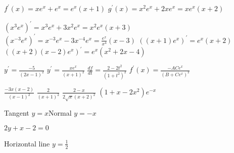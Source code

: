 \begin{Answer}[ref={exPQCRules}]
	\Question %
\begin{tasks}
	\task $f^{ \prime } \left (x\right ) =x e^{x} +e^{x} =e^{x} \left (x +1\right )$ 
	\task $g^{ \prime } \left (x\right ) =x^{2} e^{x} +2 x e^{x} =x e^{x} \left (x +2\right )$ 
\end{tasks}

\Question %
\begin{tasks}
	\task $\left (x^{3} e^{x}\right )^{ \prime } =x^{3} e^{x} +3 x^{2} e^{x} =x^{2} e^{x} \left (x +3\right )$
	\task $\left (x^{ -3} e^{x}\right )^{ \prime } =x^{ -3} e^{x} -3 x^{ -4} e^{x} =\frac{e^{x}}{x^{4}} \left (x -3\right )$ 
	\task $\left (\left (x +1\right ) e^{x}\right )^{ \prime } =e^{x} \left (x +2\right )$
	\task $\left (\left (x +2\right ) \left (x -2\right ) e^{x}\right )^{ \prime } =e^{x} \left (x^{2} +2 x -4\right )$
\end{tasks}

\Question %
\begin{tasks}
	\task $y^{ \prime } =\frac{ -5}{\left (2 x -1\right )^{2}}$ 
	\task $y^{ \prime } =\frac{x e^{x}}{\left (x +1\right )^{2}}$ 
	\task $\frac{d f}{d t} =\frac{2 -2 t^{2}}{\left (1 +t^{2}\right )^{2}}$ 
	\task $f^{ \prime } \left (x\right ) =\frac{ -A C e^{x}}{\left (B +C e^{x}\right )^{2}}$ 
\end{tasks}

\Question %
\begin{tasks}
	\task $\frac{ -3 x \left (x -2\right )}{\left (x -1\right )^{2}}$ 
	\task $\frac{2}{\left (x +1\right )^{2}}$	
	\task $\frac{2 -x}{2 \sqrt{x} \left (x +2\right )^{2}}$ 
	\task $\left (1 +x -2 x^{2}\right ) e^{ -x}$ 
\end{tasks}

\Question %
Tangent $y =x$\qquad Normal $y = -x$
\Question %
\begin{tasks}
	\task  %
	$2 y +x -2 =0$
	\task  %
\end{tasks}
\Question %
\begin{tasks}
	\task  %
	Horizontal line $y =\frac{1}{2}$
	\task  %
\end{tasks}


\end{Answer}
